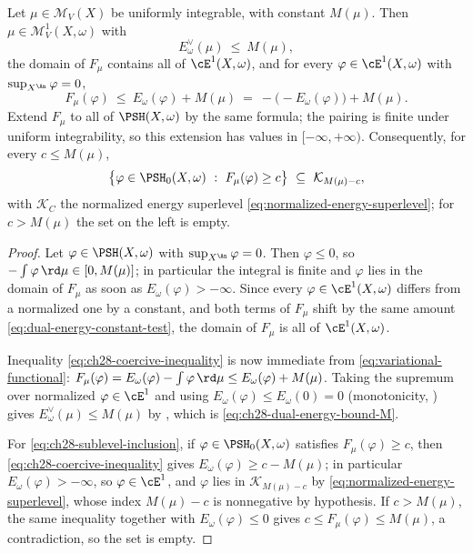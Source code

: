 \begin{lemma}
\label{lem:ch28-coercivity}
Let $\mu\in\mathcal M_V(X)$ be uniformly integrable, with constant
$M(\mu)$.  Then $\mu\in\mathcal M^1_V(X,\omega)$ with
\begin{equation}
\label{eq:ch28-dual-energy-bound-M}
 E^\vee_\omega(\mu)\ \leq\ M(\mu),
\end{equation}
the domain of $F_\mu$ contains all of $\cE^1(X,\omega)$, and for every
$\varphi\in\cE^1(X,\omega)$ with $\sup_{X^{\An}}\varphi=0$,
\begin{equation}
\label{eq:ch28-coercive-inequality}
 F_\mu(\varphi)\ \leq\ E_\omega(\varphi)+M(\mu)
 \ =\ -\bigl(-E_\omega(\varphi)\bigr)+M(\mu).
\end{equation}
Extend $F_\mu$ to all of $\PSH(X,\omega)$ by the same formula;
the pairing is finite under uniform integrability, so this extension has
values in $[-\infty,+\infty)$.  Consequently, for every $c\leq M(\mu)$,
\begin{equation}
\label{eq:ch28-sublevel-inclusion}
 \bigl\{\varphi\in\PSH_0(X,\omega)\ :\ F_\mu(\varphi)\geq c\bigr\}
 \ \subseteq\ \mathcal K_{M(\mu)-c},
\end{equation}
with $\mathcal K_C$ the normalized energy superlevel
\eqref{eq:normalized-energy-superlevel}; for $c>M(\mu)$ the set on the
left is empty.
\end{lemma}

\begin{proof}
Let $\varphi\in\PSH(X,\omega)$ with $\sup_{X^{\An}}\varphi=0$.  Then
$\varphi\leq0$, so $-\int\varphi\,\rd\mu\in[0,M(\mu)]$; in particular
the integral is finite and $\varphi$ lies in the domain of $F_\mu$ as
soon as $E_\omega(\varphi)>-\infty$.  Since every
$\varphi\in\cE^1(X,\omega)$ differs from a normalized one by a constant,
and both terms of $F_\mu$ shift by the same amount
\eqref{eq:dual-energy-constant-test}, the domain of $F_\mu$ is all of
$\cE^1(X,\omega)$.

Inequality \eqref{eq:ch28-coercive-inequality} is now immediate from
\eqref{eq:variational-functional}:
$F_\mu(\varphi)=E_\omega(\varphi)-\int\varphi\,\rd\mu\leq
E_\omega(\varphi)+M(\mu)$.  Taking the supremum over normalized
$\varphi\in\cE^1$ and using $E_\omega(\varphi)\leq E_\omega(0)=0$
(monotonicity, ) gives
$E^\vee_\omega(\mu)\leq M(\mu)$ by
, which is
\eqref{eq:ch28-dual-energy-bound-M}.

For \eqref{eq:ch28-sublevel-inclusion}, if $\varphi\in\PSH_0(X,\omega)$
satisfies $F_\mu(\varphi)\geq c$, then
\eqref{eq:ch28-coercive-inequality} gives
$E_\omega(\varphi)\geq c-M(\mu)$; in particular
$E_\omega(\varphi)>-\infty$, so $\varphi\in\cE^1$, and $\varphi$ lies
in $\mathcal K_{M(\mu)-c}$ by \eqref{eq:normalized-energy-superlevel},
whose index $M(\mu)-c$ is nonnegative by hypothesis.  If $c>M(\mu)$, the
same inequality together with $E_\omega(\varphi)\leq0$ gives
$c\leq F_\mu(\varphi)\leq M(\mu)$, a contradiction, so the set is empty.
\end{proof}

